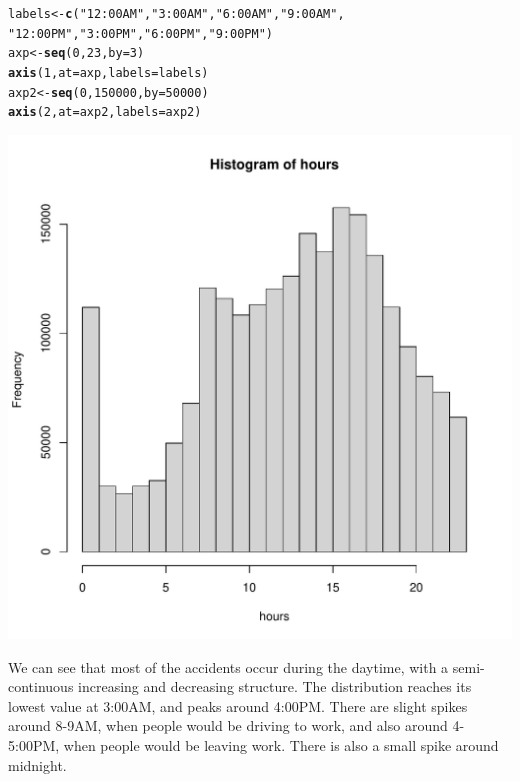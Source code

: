 \documentclass[10pt]{article}\usepackage[]{graphicx}\usepackage[]{xcolor}
\makeatletter
\def\maxwidth{ %
  \ifdim\Gin@nat@width>\linewidth
    \linewidth
  \else
    \Gin@nat@width
  \fi
}
\newcommand{\hlnum}[1]{\textcolor[rgb]{0.686,0.059,0.569}{#1}}%
\newcommand{\hlsng}[1]{\textcolor[rgb]{0.192,0.494,0.8}{#1}}%
\newcommand{\hldef}[1]{\textcolor[rgb]{0.345,0.345,0.345}{#1}}%
\newcommand{\hlkwb}[1]{\textcolor[rgb]{0.69,0.353,0.396}{#1}}%
\newcommand{\hlkwc}[1]{\textcolor[rgb]{0.333,0.667,0.333}{#1}}%
\newcommand{\hlkwd}[1]{\textcolor[rgb]{0.737,0.353,0.396}{\textbf{#1}}}%
\newenvironment{kframe}{%
 \def\at@end@of@kframe{}%
 \ifinner\ifhmode%
  \def\at@end@of@kframe{\end{minipage}}%
  \begin{minipage}{\columnwidth}%
 \fi\fi%
 \def\FrameCommand##1{\hskip\@totalleftmargin \hskip-\fboxsep
 \colorbox{shadecolor}{##1}\hskip-\fboxsep
     \hskip-\linewidth \hskip-\@totalleftmargin \hskip\columnwidth}%
 \MakeFramed {\advance\hsize-\width
   \@totalleftmargin\z@ \linewidth\hsize
   \@setminipage}}%
 {\par\unskip\endMakeFramed%
 \at@end@of@kframe}
\newenvironment{knitrout}{}{} %
\makeatother
\begin{document}
\begin{knitrout}
\begin{kframe}
\begin{alltt}
\hldef{labels} \hlkwb{<-} \hlkwd{c}\hldef{(}\hlsng{"12:00AM"}\hldef{,} \hlsng{"3:00AM"}\hldef{,} \hlsng{"6:00AM"}\hldef{,} \hlsng{"9:00AM"}\hldef{,}
            \hlsng{"12:00PM"}\hldef{,} \hlsng{"3:00PM"}\hldef{,} \hlsng{"6:00PM"}\hldef{,} \hlsng{"9:00PM"}\hldef{)}
\hldef{axp} \hlkwb{<-} \hlkwd{seq}\hldef{(}\hlnum{0}\hldef{,} \hlnum{23}\hldef{,} \hlkwc{by}\hldef{=}\hlnum{3}\hldef{)}
\hlkwd{axis}\hldef{(}\hlnum{1}\hldef{,} \hlkwc{at}\hldef{=axp,} \hlkwc{labels} \hldef{= labels)}
\hldef{axp2} \hlkwb{<-} \hlkwd{seq}\hldef{(}\hlnum{0}\hldef{,} \hlnum{150000}\hldef{,} \hlkwc{by}\hldef{=}\hlnum{50000}\hldef{)}
\hlkwd{axis}\hldef{(}\hlnum{2}\hldef{,} \hlkwc{at} \hldef{= axp2,} \hlkwc{labels} \hldef{= axp2)}
\end{alltt}
\end{kframe}
\includegraphics[width=\maxwidth]{figure/unnamed-chunk-5-1} 
\end{knitrout}

We can see that most of the accidents occur during the daytime, with a semi-continuous increasing and decreasing structure. The distribution reaches its lowest value at 3:00AM, and peaks around 4:00PM. There are slight spikes around 8-9AM, when people would be driving to work, and also around 4-5:00PM, when people would be leaving work. There is also a small spike around midnight.
\end{document}
